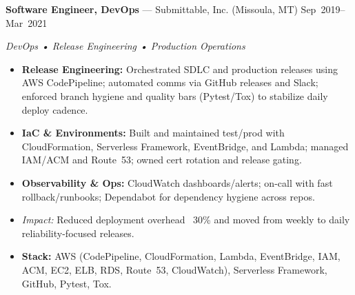\documentclass[10pt]{article}
\begin{document}
\newpage

\noindent\textbf{Software Engineer, DevOps} — Submittable, Inc. (Missoula, MT) \hfill Sep~2019--Mar~2021\par
\emph{DevOps • Release Engineering • Production Operations}\par
\begin{itemize}
  \item \textbf{Release Engineering:} Orchestrated SDLC and production releases using AWS CodePipeline; automated comms via GitHub releases and Slack; enforced branch hygiene and quality bars (Pytest/Tox) to stabilize daily deploy cadence.
  \item \textbf{IaC \& Environments:} Built and maintained test/prod with CloudFormation, Serverless Framework, EventBridge, and Lambda; managed IAM/ACM and Route~53; owned cert rotation and release gating.
  \item \textbf{Observability \& Ops:} CloudWatch dashboards/alerts; on-call with fast rollback/runbooks; Dependabot for dependency hygiene across repos.
  \item \textit{Impact:} Reduced deployment overhead ~30\% and moved from weekly to daily reliability-focused releases.
  \item \textbf{Stack:} AWS (CodePipeline, CloudFormation, Lambda, EventBridge, IAM, ACM, EC2, ELB, RDS, Route~53, CloudWatch), Serverless Framework, GitHub, Pytest, Tox.
\end{itemize}
\end{document}
